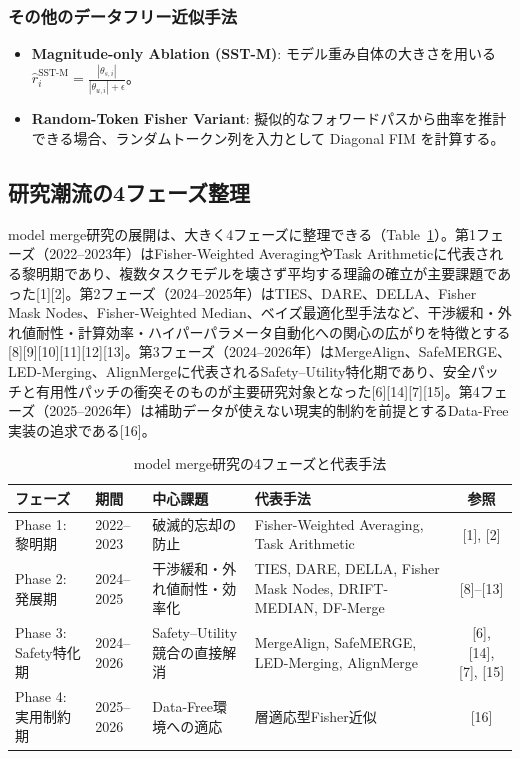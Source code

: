 \documentclass{article}
\begin{document}
\subsubsection{その他のデータフリー近似手法}
\begin{itemize}
    \item \textbf{Magnitude-only Ablation (SST-M)}: モデル重み自体の大きさを用いる $\hat{r}_i^{\text{SST-M}} = \frac{|\theta_{s,i}|}{|\theta_{u,i}| + \epsilon}$。
    \item \textbf{Random-Token Fisher Variant}: 擬似的なフォワードパスから曲率を推計できる場合、ランダムトークン列を入力として Diagonal FIM を計算する。
\end{itemize}

\subsection{研究潮流の4フェーズ整理}

model merge研究の展開は、大きく4フェーズに整理できる（Table~\ref{tab:merge-phases}）。第1フェーズ（2022–2023年）はFisher-Weighted AveragingやTask Arithmeticに代表される黎明期であり、複数タスクモデルを壊さず平均する理論の確立が主要課題であった[1][2]。第2フェーズ（2024–2025年）はTIES、DARE、DELLA、Fisher Mask Nodes、Fisher-Weighted Median、ベイズ最適化型手法など、干渉緩和・外れ値耐性・計算効率・ハイパーパラメータ自動化への関心の広がりを特徴とする[8][9][10][11][12][13]。第3フェーズ（2024–2026年）はMergeAlign、SafeMERGE、LED-Merging、AlignMergeに代表されるSafety–Utility特化期であり、安全パッチと有用性パッチの衝突そのものが主要研究対象となった[6][14][7][15]。第4フェーズ（2025–2026年）は補助データが使えない現実的制約を前提とするData-Free実装の追求である[16]。
\begin{table}[htbp]
\centering
\caption{model merge研究の4フェーズと代表手法}
\label{tab:merge-phases}
\small
\begin{tabular}{p{2.3cm}p{1.8cm}p{3.2cm}p{5.2cm}c}
\toprule
フェーズ & 期間 & 中心課題 & 代表手法 & 参照 \\
\midrule
Phase 1: 黎明期 & 2022--2023 & 破滅的忘却の防止 & Fisher-Weighted Averaging, Task Arithmetic & [1], [2] \\

Phase 2: 発展期 & 2024--2025 & 干渉緩和・外れ値耐性・効率化 & TIES, DARE, DELLA, Fisher Mask Nodes, DRIFT-MEDIAN, DF-Merge & [8]--[13] \\

Phase 3: Safety特化期 & 2024--2026 & Safety--Utility競合の直接解消 & MergeAlign, SafeMERGE, LED-Merging, AlignMerge & [6], [14], [7], [15] \\

Phase 4: 実用制約期 & 2025--2026 & Data-Free環境への適応
& 層適応型Fisher近似 & [16] \\
\bottomrule
\end{tabular}
\end{table}
\end{document}
